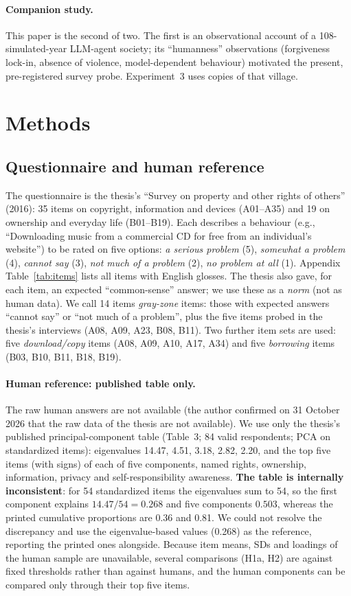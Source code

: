 \documentclass[11pt]{article}
\begin{document}
\paragraph{Companion study.}
This paper is the second of two. The first \citep{tanohata2026village} is an observational account of a 108-simulated-year LLM-agent society; its ``humanness'' observations (forgiveness lock-in, absence of violence, model-dependent behaviour) motivated the present, pre-registered survey probe. Experiment~3 uses copies of that village.

\section{Methods}

\subsection{Questionnaire and human reference}
The questionnaire is the thesis's ``Survey on property and other rights of others'' (2016): 35 items on copyright, information and devices (A01--A35) and 19 on ownership and everyday life (B01--B19). Each describes a behaviour (e.g., ``Downloading music from a commercial CD for free from an individual's website'') to be rated on five options: \emph{a serious problem} (5), \emph{somewhat a problem} (4), \emph{cannot say} (3), \emph{not much of a problem} (2), \emph{no problem at all} (1). Appendix Table~\ref{tab:items} lists all items with English glosses. The thesis also gave, for each item, an expected ``common-sense'' answer; we use these as a \emph{norm} (not as human data). We call 14 items \emph{gray-zone} items: those with expected answers ``cannot say'' or ``not much of a problem'', plus the five items probed in the thesis's interviews (A08, A09, A23, B08, B11). Two further item sets are used: five \emph{download/copy} items (A08, A09, A10, A17, A34) and five \emph{borrowing} items (B03, B10, B11, B18, B19).

\paragraph{Human reference: published table only.}
The raw human answers are not available (the author confirmed on 31 October 2026 that the raw data of the thesis are not available). We use only the thesis's published principal-component table (Table~3; 84 valid respondents; PCA on standardized items): eigenvalues 14.47, 4.51, 3.18, 2.82, 2.20, and the top five items (with signs) of each of five components, named rights, ownership, information, privacy and self-responsibility awareness. \textbf{The table is internally inconsistent}: for 54 standardized items the eigenvalues sum to 54, so the first component explains $14.47/54 = 0.268$ and five components $0.503$, whereas the printed cumulative proportions are 0.36 and 0.81. We could not resolve the discrepancy and use the eigenvalue-based values (0.268) as the reference, reporting the printed ones alongside. Because item means, SDs and loadings of the human sample are unavailable, several comparisons (H1a, H2) are against fixed thresholds rather than against humans, and the human components can be compared only through their top five items.
\end{document}
